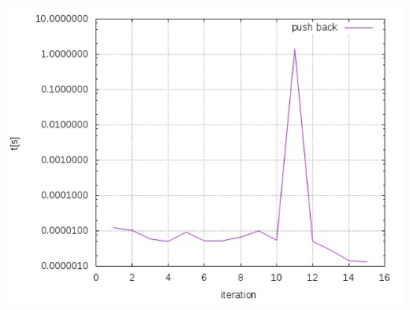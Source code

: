 \documentclass{beamer}
\begin{document}
\begin{frame}
	\includegraphics[width=\textwidth,height=0.8\textheight,keepaspectratio]
					{move_without_noexcept.jpeg}
\end{frame}
\end{document}

